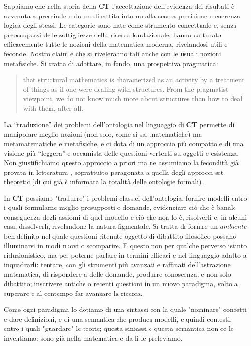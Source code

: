 \documentclass[a4paper, 11pt]{article}
\begin{document}
	  Sappiamo che nella storia della \textbf{CT} l'accettazione dell'evidenza dei risultati è avvenuta a prescindere da un dibattito intorno alla scarsa precisione e coerenza logica degli stessi. Le categorie sono nate come strumento concettuale e, senza preoccuparsi delle sottigliezze della ricerca fondazionale, hanno catturato efficacemente tutte le nozioni della matematica moderna, rivelandosi utili e feconde. Nostro claim è che si riveleranno tali anche con le usuali nozioni metafisiche. Si tratta di adottare, in fondo, una prospettiva pragmatica:
	  \begin{quotation}
	  	that structural mathematics is characterized as an activity by a treatment of things as if one were dealing with structures. From the pragmatist viewpoint, we do not know much more about structures than how to deal with them, after all.
	  \end{quotation}
	  La ``traduzione'' dei problemi dell'ontologia nel linguaggio di \textbf{CT} permette di manipolare meglio nozioni (non solo, come si sa, matematiche) ma metamatematiche e metafisiche, e ci dota di un approccio più compatto e di una visione più ``leggera'' e occamista delle questioni vertenti su oggetti e esistenza. Non giustifichiamo questo approccio a priori ma ne assumiamo la fecondità già provata in letteratura \endfo, soprattutto paragonata a quella degli approcci set-theoretic (di cui già è informata la totalità delle ontologie formali).
	 
	 In \textbf{CT} possiamo "tradurre" i problemi classici dell'ontologia, fornire modelli entro i quali formularne meglio presupposti e domande, evidenziare ciò che è banale conseguenza degli assiomi di quel modello e ciò che non lo è, risolverli e, in alcuni casi, dissolverli, rivelandone la natura figmentale. Si tratta di fornire un \emph{ambiente} ben definito nel quale questioni ritenute oggetto di dibattito filosofico possano illuminarsi in modi nuovi o scomparire. E questo non per qualche perverso istinto riduzionistico, ma per poterne parlare in termini efficaci e nel linguaggio adatto a inquadrarli: tentare, con gli strumenti più avanzati e raffinati dell'astrazione matematica, di rispondere a delle domande, produrre conoscenza, e non solo dibattito; inscrivere antiche o recenti questioni in un nuovo paradigma, volto a superare e al contempo far avanzare la ricerca.
	
	Come ogni paradigma lo dotiamo di una sintassi con la quale "nominare" concetti e dare definizioni, e di una semantica che produca modelli, e quindi contesti, entro i quali "guardare" le teorie; questa sintassi e questa semantica non ce le inventiamo: sono già nella matematica e da lì le preleviamo. 
	
\end{document}

